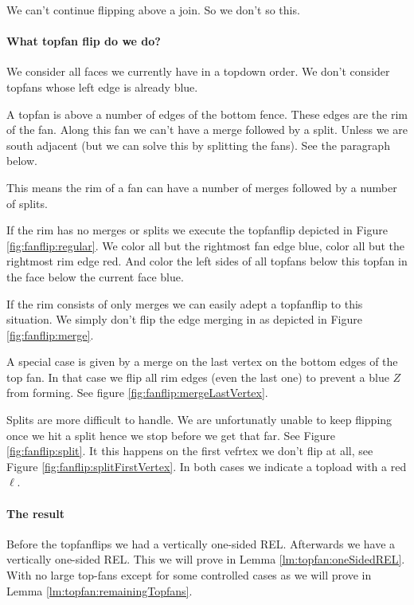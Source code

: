 We can't continue flipping above a join. So we don't so this.

\paragraph{What topfan flip do we do?}
We consider all faces we currently have in a topdown order. We don't consider topfans whose left edge is already blue. 

A topfan is above a number of edges of the bottom fence. These edges are the rim of the fan.  Along this fan we can't have a merge followed by a split. Unless we are south adjacent (but we can solve this by splitting the fans). See the paragraph below.

This means the rim of a fan can have a number of merges followed by a number of splits.

If the rim has no merges or splits we execute the topfanflip depicted in Figure \ref{fig:fanflip:regular}. We color all but the rightmost fan edge blue, color all but the rightmost rim edge red. And color the left sides of all topfans below this topfan in the face below the current face blue.

If the rim consists of only merges we can easily adept a topfanflip to this situation. We simply don't flip the edge merging in as depicted in Figure \ref{fig:fanflip:merge}.

A special case is given by a merge on the last vertex on the bottom edges of the top fan. In that case we flip all rim edges (even the last one) to prevent a blue $Z$ from forming. See figure \ref{fig:fanflip:mergeLastVertex}.

Splits are more difficult to handle. We are unfortunatly unable to keep flipping once we hit a split hence we stop before we get that far. See Figure \ref{fig:fanflip:split}. It this happens on the first vefrtex we don't flip at all, see Figure \ref{fig:fanflip:splitFirstVertex}. In both cases we indicate a topload with a red $\ell$.


\paragraph{The result}
Before the topfanflips we had a vertically one-sided REL. Afterwards we have a vertically one-sided REL. This we will prove in Lemma \ref{lm:topfan:oneSidedREL}. With no large top-fans except for some controlled cases as we will prove in Lemma \ref{lm:topfan:remainingTopfans}.

